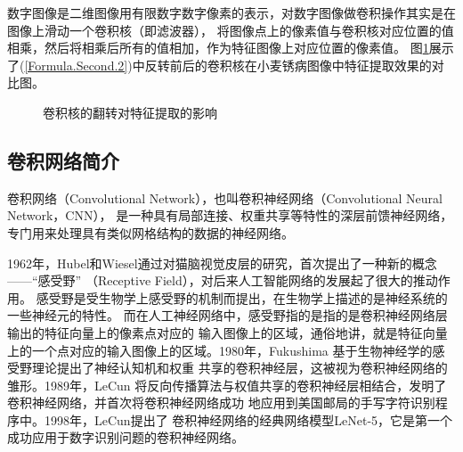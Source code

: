   数字图像是二维图像用有限数字数字像素的表示\cite{wiki:xxx}，对数字图像做卷积操作其实是在图像上滑动一个卷积核（即滤波器），
  将图像点上的像素值与卷积核对应位置的值相乘，然后将相乘后所有的值相加，作为特征图像上对应位置的像素值。
  图\ref{Figure.Second.1}展示了(\ref{Formula.Second.2})中反转前后的卷积核在小麦锈病图像中特征提取效果的对比图。
  \begin{figure}[H]
    \centering %
    \caption{卷积核的翻转对特征提取的影响}
    \label{Figure.Second.1}
  \end{figure}
  

  
  \subsection{\hei\xiaosan\textbf{卷积网络简介}}
    卷积网络（Convolutional Network），也叫卷积神经网络（Convolutional Neural Network，CNN），
    是一种具有局部连接、权重共享等特性的深层前馈神经网络，专门用来处理具有类似网格结构的数据的神经网络。
    

    1962年，Hubel和Wiesel通过对猫脑视觉皮层的研究，首次提出了一种新的概念——“感受野”
    （Receptive Field），对后来人工智能网络的发展起了很大的推动作用\cite{hubel1962receptive}。
    感受野是受生物学上感受野的机制而提出，在生物学上描述的是神经系统的一些神经元的特性。
    而在人工神经网络中，感受野指的是指的是卷积神经网络层输出的特征向量上的像素点对应的
    输入图像上的区域，通俗地讲，就是特征向量上的一个点对应的输入图像上的区域。1980年，Fukushima
    \cite{fukushima1982neocognitron}基于生物神经学的感受野理论提出了神经认知机和权重
    共享的卷积神经层，这被视为卷积神经网络的雏形。1989年，LeCun\cite{lecun1989backpropagation}
    将反向传播算法与权值共享的卷积神经层相结合，发明了卷积神经网络，并首次将卷积神经网络成功
    地应用到美国邮局的手写字符识别程序中。1998年，LeCun\cite{lecun1998gradient}提出了
    卷积神经网络的经典网络模型LeNet-5，它是第一个成功应用于数字识别问题的卷积神经网络。
    
